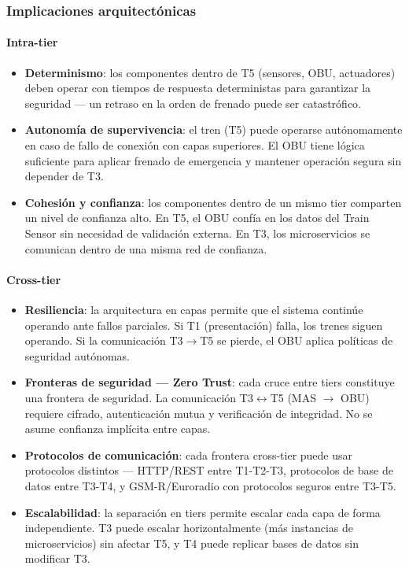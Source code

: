\documentclass[a4paper, 10 pt]{article}
\begin{document}
\subsubsection{Implicaciones arquitectónicas}

\paragraph{Intra-tier}
\begin{itemize}
    \item \textbf{Determinismo}: los componentes dentro de T5 (sensores, OBU, actuadores) deben operar con tiempos de respuesta deterministas para garantizar la seguridad --- un retraso en la orden de frenado puede ser catastrófico.
    \item \textbf{Autonomía de supervivencia}: el tren (T5) puede operarse autónomamente en caso de fallo de conexión con capas superiores. El OBU tiene lógica suficiente para aplicar frenado de emergencia y mantener operación segura sin depender de T3.
    \item \textbf{Cohesión y confianza}: los componentes dentro de un mismo tier comparten un nivel de confianza alto. En T5, el OBU confía en los datos del Train Sensor sin necesidad de validación externa. En T3, los microservicios se comunican dentro de una misma red de confianza.
\end{itemize}

\paragraph{Cross-tier}
\begin{itemize}
    \item \textbf{Resiliencia}: la arquitectura en capas permite que el sistema continúe operando ante fallos parciales. Si T1 (presentación) falla, los trenes siguen operando. Si la comunicación T3$\rightarrow$T5 se pierde, el OBU aplica políticas de seguridad autónomas.
    \item \textbf{Fronteras de seguridad --- Zero Trust}: cada cruce entre tiers constituye una frontera de seguridad. La comunicación T3$\leftrightarrow$T5 (MAS $\rightarrow$ OBU) requiere cifrado, autenticación mutua y verificación de integridad. No se asume confianza implícita entre capas.
    \item \textbf{Protocolos de comunicación}: cada frontera cross-tier puede usar protocolos distintos --- HTTP/REST entre T1-T2-T3, protocolos de base de datos entre T3-T4, y GSM-R/Euroradio con protocolos seguros entre T3-T5.
    \item \textbf{Escalabilidad}: la separación en tiers permite escalar cada capa de forma independiente. T3 puede escalar horizontalmente (más instancias de microservicios) sin afectar T5, y T4 puede replicar bases de datos sin modificar T3.
\end{itemize}
\end{document}
